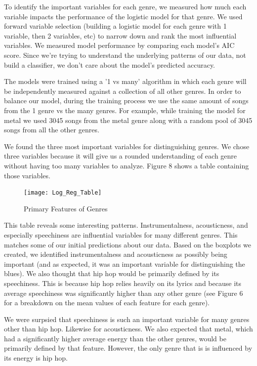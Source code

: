 \documentclass[11pt, a4paper, twocolumn]{article}
\begin{document}
To identify the important variables for each genre, we measured how much each variable impacts the performance of the logistic model for that genre. We used forward variable selection (building a logistic model for each genre with 1 variable, then 2 variables, etc) to narrow down and rank the most influential variables. We measured model performance by comparing each model's AIC score. Since we're trying to understand the underlying patterns of our data, not build a classifier, we don't care about the model's predicted accuracy.

The models were trained using a '1 vs many' algorithm in which each genre will be independently measured against a collection of all other genres. In order to balance our model, during the training process we use the same amount of songs from the 1 genre vs the many genres. For example, while training the model for metal we used 3045 songs from the metal genre along with a random pool of 3045 songs from all the other genres.

We found the three most important variables for distinguishing genres. We chose three variables because it will give us a rounded understanding of each genre without having too many variables to analyze. Figure 8 shows a table containing those variables.
\begin{figure}[htb!]
\centerline{\texttt{[image: Log\_Reg\_Table]}}
\caption{Primary Features of Genres}
\end{figure}
This table reveals some interesting patterns. Instrumentalness, acousticness, and especially speechiness are influential variables for many different genres. This matches some of our initial predictions about our data. Based on the boxplots we created, we identified instrumentalness and acousticness as possibly being important (and as expected, it was an important variable for distinguishing the blues). We also thought that hip hop would be primarily defined by its speechiness. This is because hip hop relies heavily on its lyrics and because its average speechiness was significantly higher than any other genre (see Figure 6 for a breakdown on the mean values of each feature for each genre).

We were surpsied that speechiness is such an important variable for many genres other than hip hop. Likewise for acousticness. We also expected that metal, which had a significantly higher average energy than the other genres, would be primarily defined by that feature. However, the only genre that is is influenced by its energy is hip hop.
\end{document}
